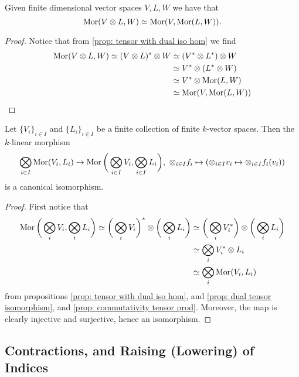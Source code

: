 \begin{corollary}
    Given finite dimensional vector spaces \(V, L, W\) we have that
    \[
        \operatorname{Mor}(V \otimes L, W) \simeq \operatorname{Mor}(V, \operatorname{Mor}(L, W)).
    \]
\end{corollary}

\begin{proof}
    Notice that from \cref{prop: tensor with dual iso hom} we find
    \begin{align*}
        \operatorname{Mor}(V \otimes L, W) \simeq (V \otimes L)^* \otimes W
         & \simeq (V^* \otimes L^*) \otimes W \\
         & \simeq V^* \otimes (L^* \otimes W) \\
         & \simeq V^* \otimes \operatorname{Mor}(L, W)      \\
         & \simeq \operatorname{Mor}(V, \operatorname{Mor}(L, W))
    \end{align*}
\end{proof}

\begin{corollary}
    Let \(\{V_i\}_{i \in I}\) and \(\{L_i\}_{i \in I}\) be a finite collection of
    finite \(k\)-vector spaces. Then the \(k\)-linear morphism
    \[
        \bigotimes_{i \in I} \operatorname{Mor}(V_i, L_i) \to
        \operatorname{Mor}\bigg( \bigotimes_{i \in I} V_i, \bigotimes_{i \in I} L_i \bigg),\
        \otimes_{i \in I} f_i \mapsto (\otimes_{i \in I} v_i \mapsto \otimes_{i \in
            I} f_i(v_i))
    \]
    is a canonical isomorphism.
\end{corollary}

\begin{proof}
    First notice that
    \begin{align*}
        \operatorname{Mor}\bigg( \bigotimes_i V_i, \bigotimes_i L_i \bigg)
        \simeq \bigg(\bigotimes_i V_i \bigg)^* \otimes \bigg( \bigotimes_i L_i \bigg)
         & \simeq \bigg( \bigotimes_i V_i^* \bigg)
        \otimes \bigg( \bigotimes_i L_i \bigg)   \\
         & \simeq \bigotimes_i V_i^* \otimes L_i   \\
         & \simeq \bigotimes_i \operatorname{Mor}(V_i, L_i)
    \end{align*}
    from propositions \ref{prop: tensor with dual iso hom}, and \ref{prop: dual
        tensor isomorphism}, and \ref{prop: commutativity tensor prod}. Moreover,
    the map is clearly injective and surjective, hence an isomorphism.
\end{proof}

\subsection{Contractions, and Raising (Lowering) of Indices}

